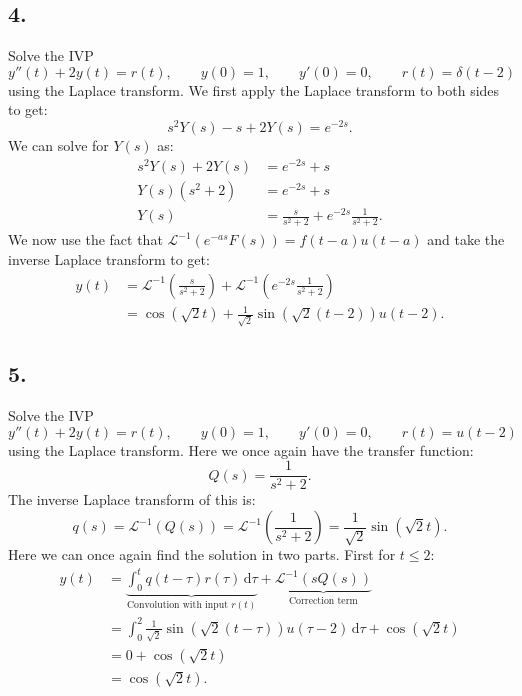 \subsection*{4.} Solve the IVP
\[ 
y''(t) + 2y(t) = r(t), \qquad y(0) = 1, \qquad y'(0) = 0, \qquad r(t) = \delta(t-2)
\]
using the Laplace transform.
\bigbreak
We first apply the Laplace transform to both sides to get:
\[ 
s^2 Y(s) -s + 2Y(s) = e^{-2s}
.\]
We can solve for $Y(s)$ as:
\begin{align*}
  s^2Y(s) + 2Y(s) &= e^{-2s}+s \\
  Y(s) \left( s^2 + 2 \right) &= e^{-2s}+s \\
  Y(s) &= \frac{s}{s^2+2} + e^{-2s} \frac{1}{s^2+2}
.\end{align*}
We  now use the fact that $\mathcal{L}^{-1}\left( e^{-as}F(s) \right) = f(t-a)u(t-a)$ and take the inverse Laplace transform to get:
\begin{align*}
  y(t) &= \mathcal{L}^{-1}\left( \frac{s}{s^2+2} \right) + \mathcal{L}^{-1}\left( e^{-2s} \frac{1}{s^2+2} \right)  \\
  &= \cos \left( \sqrt{2}t \right) + \frac{1}{\sqrt{2}}\sin \left( \sqrt{2}\left( t-2 \right)  \right) u(t-2)
.\end{align*}


\subsection*{5.} Solve the IVP
\[ 
y''(t) + 2y(t) = r(t), \qquad y(0) = 1, \qquad y'(0) = 0, \qquad r(t) = u(t-2)
\]
using the Laplace transform.
\bigbreak
Here we once again have the transfer function:
\[ 
Q(s) = \frac{1}{s^2 + 2}
.\]
The inverse Laplace transform of this is:
\[ 
q(s) = \mathcal{L}^{-1}\left( Q(s) \right) = \mathcal{L}^{-1}\left( \frac{1}{s^2+2} \right) = \frac{1}{\sqrt{2}}\sin \left( \sqrt{2}t \right) 
.\]
Here we can once again find the solution in two parts. First for $t \leq 2$:
\begin{align*}
  y(t) &= \underbrace{\int_{0}^{t} q \left( t-\tau \right) r(\tau) \, \mathrm{d}\tau}_{\text{Convolution with input } r(t)} + \underbrace{\mathcal{L}^{-1}\left( sQ(s) \right) }_{\text{Correction term}} \\
  &= \int_{0}^{2} \frac{1}{\sqrt{2}} \sin \left( \sqrt{2}\left( t-\tau \right) \right) u \left( \tau - 2 \right) \, \mathrm{d}\tau + \cos \left( \sqrt{2}t \right) \\
  &= 0 + \cos(\sqrt{2}t)\\
  &= \cos (\sqrt{2}t)
.\end{align*}


